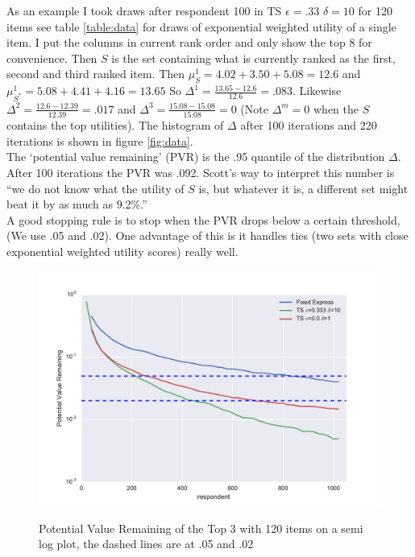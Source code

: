 \documentclass[nonblindrev]{informs3}
\begin{document}
As an example I took draws after respondent 100 in TS $\epsilon=.33$ $\delta=10$ for 120 items see table \ref{table:data} for draws of exponential weighted utility of a single item. I put the columns in current rank order and only show the top 8 for convenience. Then $S$ is the set containing what is currently ranked as the first, second and third ranked item. Then $\mu^1_{S}=4.02+3.50+5.08=12.6$ and $\mu_{S^*}^{1}=5.08+4.41+4.16=13.65$ So $\Delta^{1}=\frac{13.65-12.6}{12.6}=.083$. Likewise $\Delta^{2}=\frac{12.6-12.39}{12.39}=.017$ and $\Delta^{3}=\frac{15.08-15.08}{15.08}=0$ (Note $\Delta^m=0$ when the $S$ contains the top utilities). The histogram of $\Delta$ after 100 iterations and 220 iterations is shown in figure \ref{fig:data}. \\
 The `potential value remaining' (PVR) is the .95 quantile of the distribution $\Delta$. After 100 iterations the PVR was .092. Scott's way to interpret this number is ``we do not know what the utility of $S$ is, but whatever it is, a different set might beat it by as much as 9.2\%.''\\
 A good stopping rule is to stop when the PVR drops below a certain threshold, (We use .05 and .02). One advantage of this is it handles ties (two sets with close exponential weighted utility scores) really well. 
\begin{figure}
\caption{Potential Value Remaining of the Top 3 with 120 items on a semi log plot, the dashed lines are at .05 and .02}
\includegraphics[width=1\textwidth]{plots/3vr120show3.pdf}
\label{fig:3vr}
\end{figure}
\end{document}
